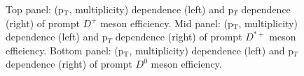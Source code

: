 \begin{figure}[!htp]
\caption{Top panel: (p$_\mathrm{T}$, multiplicity) dependence (left) and p$_T$ dependence (right) of prompt $D^{+}$ meson efficiency. 
Mid panel: (p$_\mathrm{T}$, multiplicity) dependence (left) and p$_T$ dependence (right) of prompt $D^{*+}$ meson efficiency. 
Bottom panel: (p$_\mathrm{T}$, multiplicity) dependence (left) and p$_T$ dependence (right) of prompt $D^{0}$ meson efficiency.
}
	\label{fig:d0eff}	
\end{figure}

